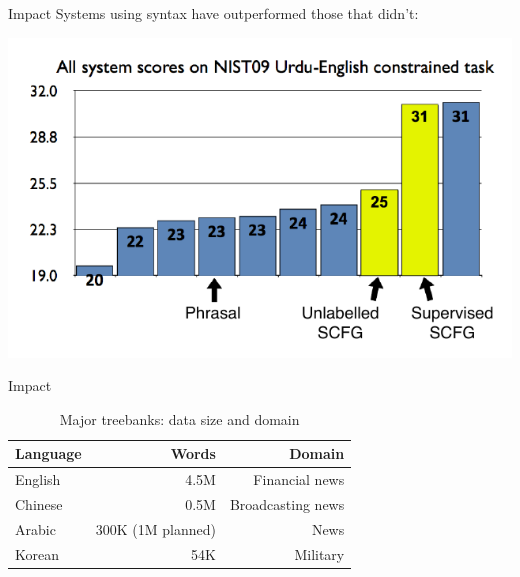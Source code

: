 \documentclass{beamer}
\begin{document}




\begin{frame}[t]{Impact}
Systems using syntax have outperformed those that didn't:
  \begin{center}
    \includegraphics[scale=1.0]{ccb_graph1.pdf}
  \end{center}
\end{frame}


\begin{frame}[t]{Impact}
\vspace{0.5in}
\begin{table}
  \begin{tabular}{l|rr}
    \hline
    Language & Words &  Domain \\ \hline
    English & 4.5M& Financial news \\
    Chinese & 0.5M & Broadcasting news \\ 
    Arabic &  300K (1M planned)  &  News  \\
    Korean & 54K  & Military \\ \hline
  \end{tabular}
\caption{Major treebanks: data size and domain \label{table_treebanks_size}}
\end{table}
\end{frame}
\end{document}

